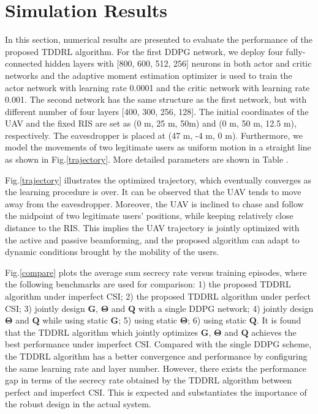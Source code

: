 \documentclass[12pt, draftclsnofoot, onecolumn]{IEEEtran}
\begin{document}
\section{Simulation Results}
In this section, numerical results are presented to evaluate the performance of the proposed TDDRL algorithm. For the first DDPG network, we deploy four fully-connected hidden layers with [800, 600, 512, 256] neurons in both actor and critic networks and the adaptive moment estimation optimizer is used to train the actor network with learning rate 0.0001 and the critic network with learning rate 0.001. The second network has the same structure as the first network, but with different number of four layers [400, 300, 256, 128]. The initial coordinates of the UAV and the fixed RIS are set as (0 m, 25 m, 50m) and (0 m, 50 m, 12.5 m), respectively. The eavesdropper is placed at (47 m, -4 m, 0 m). Furthermore, we model the movements of two legitimate users as uniform motion in a straight line as shown in Fig.\ref{trajectory}. More detailed parameters are shown in Table \uppercase\expandafter{}.


Fig.\ref{trajectory} illustrates the optimized trajectory, which eventually converges as the learning procedure is over. It can be observed that the UAV tends to move away from the eavesdropper. Moreover, the UAV is inclined to chase and follow the midpoint of two legitimate users' positions, while keeping relatively close distance to the RIS. This implies the UAV trajectory is jointly optimized with the active and passive beamforming, and the proposed algorithm can adapt to dynamic conditions brought by the mobility of the users.



Fig.\ref{compare} plots the average sum secrecy rate versus training episodes, where the following benchmarks are used for comparison: 1) the proposed TDDRL algorithm under imperfect CSI; 2) the proposed TDDRL algorithm under perfect CSI; 3) jointly design ${\bm G}$, ${\bm \Theta}$ and ${\bm Q}$ with a single DDPG network; 4) jointly design ${\bm \Theta}$ and ${\bm Q}$ while using static ${\bm G}$; 5) using static ${\bm \Theta}$; 6) using static ${\bm Q}$. It is found that the TDDRL algorithm which jointly optimizes ${\bm G}$, ${\bm \Theta}$ and ${\bm Q}$ achieves the best performance under imperfect CSI. Compared with the single DDPG scheme, the TDDRL algorithm has a better convergence and performance by configuring the same learning rate and layer number. However, there exists the performance gap in terms of the secrecy rate obtained by the TDDRL algorithm between perfect and imperfect CSI. This is expected and substantiates the importance of the robust design in the actual system.
\end{document}
